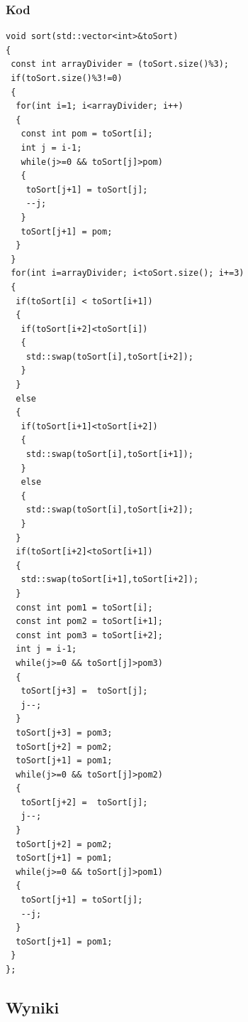\subsubsection{Kod}
\begin{lstlisting}[caption={Sortowanie przez wstawianie dla trójek},label={lst:wstawianie}]
void sort(std::vector<int>&toSort)
{
 const int arrayDivider = (toSort.size()%3);
 if(toSort.size()%3!=0)
 {
  for(int i=1; i<arrayDivider; i++)
  {
   const int pom = toSort[i];
   int j = i-1;
   while(j>=0 && toSort[j]>pom)
   {
    toSort[j+1] = toSort[j];
    --j;
   }
   toSort[j+1] = pom;
  }
 }
 for(int i=arrayDivider; i<toSort.size(); i+=3)
 {
  if(toSort[i] < toSort[i+1])
  {
   if(toSort[i+2]<toSort[i])
   {
    std::swap(toSort[i],toSort[i+2]);
   }
  }
  else
  {
   if(toSort[i+1]<toSort[i+2])
   {
    std::swap(toSort[i],toSort[i+1]);
   }
   else
   {
    std::swap(toSort[i],toSort[i+2]);
   }
  }
  if(toSort[i+2]<toSort[i+1])
  {
   std::swap(toSort[i+1],toSort[i+2]);
  }
  const int pom1 = toSort[i];
  const int pom2 = toSort[i+1];
  const int pom3 = toSort[i+2];
  int j = i-1;
  while(j>=0 && toSort[j]>pom3)
  {
   toSort[j+3] =  toSort[j];
   j--;
  }
  toSort[j+3] = pom3;
  toSort[j+2] = pom2;
  toSort[j+1] = pom1;
  while(j>=0 && toSort[j]>pom2)
  {
   toSort[j+2] =  toSort[j];
   j--;
  }
  toSort[j+2] = pom2;
  toSort[j+1] = pom1;
  while(j>=0 && toSort[j]>pom1)
  {
   toSort[j+1] = toSort[j];
   --j;
  }
  toSort[j+1] = pom1;
 }
};
\end{lstlisting}

\subsection{Wyniki}

